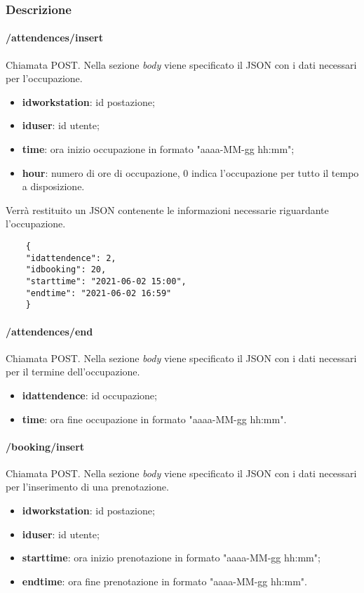 \subsubsection{Descrizione}
\paragraph{/attendences/insert}
Chiamata POST. Nella sezione \textit{body} viene specificato il JSON con i dati necessari per l'occupazione.
\begin{itemize}
	\item \textbf{idworkstation}: id postazione;
	\item \textbf{iduser}: id utente;
	\item \textbf{time}: ora inizio occupazione in formato "aaaa-MM-gg hh:mm";
	\item \textbf{hour}: numero di ore di occupazione, 0 indica l'occupazione per tutto il tempo a disposizione.
\end{itemize}
Verrà restituito un JSON contenente le informazioni necessarie riguardante l'occupazione.
\begin{center}
	\begin{lstlisting}
	{
	"idattendence": 2,
	"idbooking": 20,
	"starttime": "2021-06-02 15:00",
	"endtime": "2021-06-02 16:59"
	}
	\end{lstlisting}
\end{center}
\paragraph{/attendences/end}
Chiamata POST. Nella sezione \textit{body} viene specificato il JSON con i dati necessari per il termine dell'occupazione.
\begin{itemize}
	\item \textbf{idattendence}: id occupazione;
	\item \textbf{time}: ora fine occupazione in formato "aaaa-MM-gg hh:mm".
\end{itemize}
\paragraph{/booking/insert}
Chiamata POST. Nella sezione \textit{body} viene specificato il JSON con i dati necessari per l'inserimento di una prenotazione.
\begin{itemize}
	\item \textbf{idworkstation}: id postazione;
	\item \textbf{iduser}: id utente;
	\item \textbf{starttime}: ora inizio prenotazione in formato "aaaa-MM-gg hh:mm";
	\item \textbf{endtime}: ora fine prenotazione in formato "aaaa-MM-gg hh:mm".
\end{itemize}
